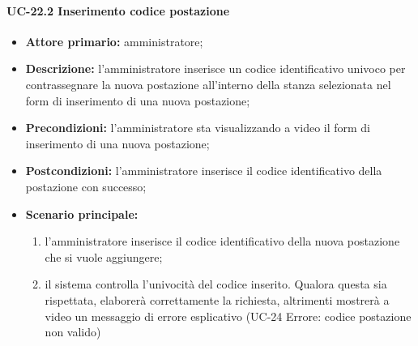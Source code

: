 \paragraph{UC-22.2 Inserimento codice postazione}
\begin{itemize}
	\item \textbf{Attore primario:} amministratore;
	\item \textbf{Descrizione:} l'amministratore inserisce un codice identificativo univoco per contrassegnare la nuova postazione all'interno della stanza selezionata nel form di inserimento di una nuova postazione;
	\item \textbf{Precondizioni:} l'amministratore sta visualizzando a video il form di inserimento di una nuova postazione;
	\item \textbf{Postcondizioni:} l'amministratore inserisce il codice identificativo della postazione con successo;
	\item \textbf{Scenario principale:}
	      \begin{enumerate}
		      \item l'amministratore inserisce il codice identificativo della nuova postazione che si vuole aggiungere;
		      \item il sistema controlla l'univocità del codice inserito. Qualora questa sia rispettata, elaborerà correttamente la richiesta, altrimenti mostrerà a video un messaggio di errore esplicativo (UC-24 Errore: codice postazione non valido)
	      \end{enumerate}
\end{itemize}
    

